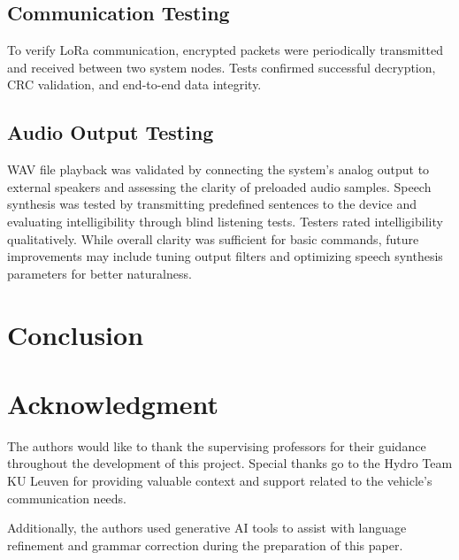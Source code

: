 \documentclass[conference]{IEEEtran}
\begin{document}
\subsection{Communication Testing}
To verify LoRa communication, encrypted packets were periodically transmitted and received between two system nodes. Tests confirmed successful decryption, CRC validation, and end-to-end data integrity.

\subsection{Audio Output Testing}
WAV file playback was validated by connecting the system's analog output to external speakers and assessing the clarity of preloaded audio samples. Speech synthesis was tested by transmitting predefined sentences to the device and evaluating intelligibility through blind listening tests. Testers rated intelligibility qualitatively. While overall clarity was sufficient for basic commands, future improvements may include tuning output filters and optimizing speech synthesis parameters for better naturalness.

\section{Conclusion}

\section*{Acknowledgment}
The authors would like to thank the supervising professors for their guidance throughout the development of this project. Special thanks go to the Hydro Team KU Leuven for providing valuable context and support related to the vehicle's communication needs. 

Additionally, the authors used generative AI tools to assist with language refinement and grammar correction during the preparation of this paper.


\end{document}
